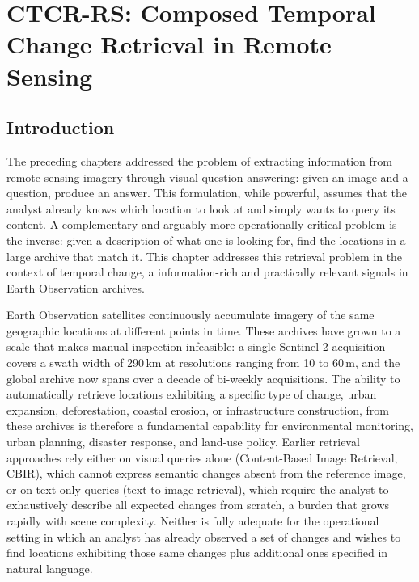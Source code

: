 \chapter{CTCR-RS: Composed Temporal Change Retrieval in Remote Sensing}
\label{chap:ctcr}

\startcontents[chapters]
\printmyminitoc{
}

\section{Introduction}
\label{sec:chap7_intro}
 
The preceding chapters addressed the problem of extracting
information from remote sensing imagery through visual
question answering: given an image and a question, produce
an answer. This formulation, while powerful, assumes that
the analyst already knows which location to look at and
simply wants to query its content. A complementary and
arguably more operationally critical problem is the inverse:
given a description of what one is looking for, find the
locations in a large archive that match it. This chapter
addresses this retrieval problem in the context of temporal
change, a information-rich and practically
relevant signals in Earth Observation archives.
 
Earth Observation satellites continuously accumulate imagery
of the same geographic locations at different points in time.
These archives have grown to a scale that makes manual
inspection infeasible: a single Sentinel-2 acquisition covers a swath width of
290\,km at resolutions ranging from 10 to 60\,m, and the
global archive now spans over a decade of bi-weekly
acquisitions. The ability to automatically retrieve locations
exhibiting a specific type of change, urban expansion,
deforestation, coastal erosion, or infrastructure construction,
from these archives is therefore a fundamental capability
for environmental monitoring, urban planning, disaster
response, and land-use policy. Earlier retrieval approaches rely either on visual queries 
alone (Content-Based Image Retrieval, CBIR), which cannot 
express semantic changes absent from the reference image, 
or on text-only queries (text-to-image retrieval), which 
require the analyst to exhaustively describe all expected 
changes from scratch, a burden that grows rapidly with 
scene complexity. Neither is fully adequate for the operational setting in 
which an analyst has already observed a set of changes and 
wishes to find locations exhibiting those same changes 
plus additional ones specified in natural language.


